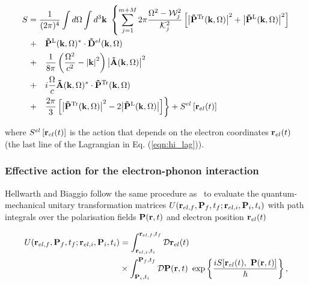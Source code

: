 \begin{equation}
    \begin{aligned}
        S &= \frac{1}{(2\pi)^4} \int d\Omega \int d^3 \vb{k}\ \left\{ \sum_{j=1}^{m+M} 2\pi \frac{\Omega^2 - \mathcal{W}_j^2}{\mathcal{K}_j^2} \left[ \abs{\vb{\Tilde{P}}^{\text{Tr}}(\vb{k}, \Omega)}^2 + \abs{\vb{\Tilde{P}}^{\text{L}}(\vb{k}, \Omega)}^2 \right] \right. \\
        &\left. +\quad \vb{\Tilde{P}}^{\text{L}}(\vb{k}, \Omega)^* \cdot \vb{\Tilde{D}}^{el}(\vb{k}, \Omega) \right. \\
        &\left. +\quad \frac{1}{8\pi} \left( \frac{\Omega^2}{c^2} - \abs{\vb{k}}^2 \right) \abs{\vb{\Tilde{A}}(\vb{k}, \Omega)}^2 \right. \\
        & \left. +\quad i \frac{\Omega}{c} \vb{\Tilde{A}}(\vb{k}, \Omega)^* \cdot \vb{\Tilde{P}}^{\text{Tr}}(\vb{k}, \Omega) \right. \\
        &\left. +\quad  \frac{2\pi}{3} \left[ \abs{\vb{\Tilde{P}}^{\text{Tr}}(\vb{k}, \Omega)}^2 - 2\abs{\vb{\Tilde{P}}^{\text{L}}(\vb{k}, \Omega)} \right] \right\} + S^{el} \left[ \vb{r}_{el}(t) \right]
    \end{aligned}
\end{equation}

where $S^{el} \left[ \vb{r}_{el}(t) \right]$ is the action that depends on the electron coordinates $\vb{r}_{el}(t)$ (the last line of the Lagrangian in Eq. (\ref{eqn:hi_lag})).

\subsubsection{Effective action for the electron-phonon interaction}
\label{subsubsec:2-3-3-3}

Hellwarth and Biaggio follow the same procedure as~\cite{feynman_slow_1955} to evaluate the quantum-mechanical unitary transformation matrices $U(\vb{r}_{el, f}, \vb{P}_f, t_f; \vb{r}_{el, i}, \vb{P}_i, t_i)$ with path integrals over the polarisation fields $\vb{P}(\vb{r}, t)$ and electron position $\vb{r}_{el}(t)$

\begin{equation}
    \begin{aligned}
    U(\vb{r}_{el, f}, \vb{P}_f, t_f; \vb{r}_{el, i}, \vb{P}_i, t_i) &= \int_{\vb{r}_{el, i}, t_i}^{\vb{r}_{el, f}, t_f} \mathcal{D}\vb{r}_{el}(t) \\
    &\times \int_{\vb{P}_i, t_i}^{\vb{P}_f, t_f} \mathcal{D}\vb{P}(\vb{r}, t)\ \exp\left\{{\frac{iS[\vb{r}_{el}(t),\ \vb{P}(\vb{r}, t)]}{\hbar}}\right\},
    \end{aligned}
\end{equation}

